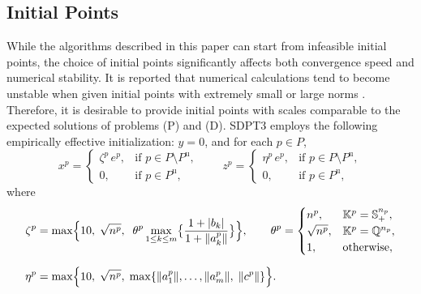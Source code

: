 \subsection{Initial Points}
\label{sec:initial_points}
While the algorithms described in this paper can start from infeasible initial points, the choice of initial points significantly affects both convergence speed and numerical stability.
It is reported that numerical calculations tend to become unstable when given initial points with extremely small or large norms \cite{toh1999}.
Therefore, it is desirable to provide initial points with scales comparable to the expected solutions of problems (P) and (D).
SDPT3 employs the following empirically effective initialization: $y = 0$, and for each $p\in P$,
\[
    x^p = \begin{cases}
        \zeta^p\, e^p, & \text{if } p \in P \setminus P^{\text{u}},\\
        0, & \text{if } p\in P^{\text{u}},
    \end{cases}
    \quad
    \quad 
    z^p = \begin{cases}
        \eta^p\, e^p, & \text{if } p \in P \setminus P^{\text{u}},\\
        0, & \text{if } p\in P^{\text{u}},
    \end{cases}
\]
where
\begin{align*}
    \zeta^p 
    &= \max\Bigl\{
       10,\;\sqrt{n^p},\;\;\theta^p \max_{1 \le k \le m}\bigl\{\frac{1 + |b_k|}{1 + \|a^p_k\|}\bigr\}
      \Bigr\},
    \quad
    \quad
    \theta^p = \begin{cases}
        n^p, & \mathbb{K}^p=\mathbb{S}^{n_p}_+,\\
        \sqrt{n^p}, & \mathbb{K}^p=\mathbb{Q}^{n_p},\\
        1, & \text{otherwise},
    \end{cases}
    \\[6pt]
    \eta^p 
    &= \max\Bigl\{
       10,\;\sqrt{n^p},\;\max\{\|a^p_1\|,\ldots,\|a^p_m\|,\;\|c^p\|\}
      \Bigr\}.
\end{align*}



